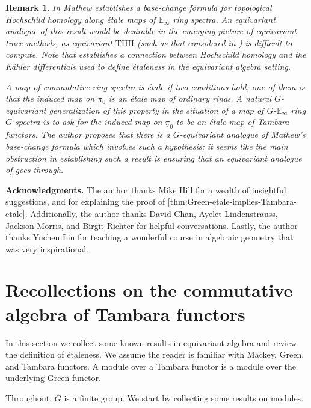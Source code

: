 \documentclass[11pt,dvipsnames]{amsart}
\theoremstyle{BoldRemark}
\newtheorem{remark}[theorem]{Remark}
\begin{document}
\begin{remark}
    In \cite{Mat17} Mathew establishes a base-change formula for topological Hochschild homology along \'{e}tale maps of $\mathbb{E}_\infty$ ring spectra. An equivariant analogue of this result would be desirable in the emerging picture of equivariant trace methods, as equivariant $\mathrm{THH}$ (such as that considered in \cite{CGK25}) is difficult to compute. Note that \cite[Theorem 4.19]{MQS24} establishes a connection between Hochschild homology and the K\"{a}hler differentials used to define \'{e}taleness in the equivariant algebra setting.
    
    A map of commutative ring spectra is \'{e}tale if two conditions hold; one of them is that the induced map on $\pi_0$ is an \'{e}tale map of ordinary rings. A natural $G$-equivariant generalization of this property in the situation of a map of $G$-$\mathbb{E}_\infty$ ring $G$-spectra is to ask for the induced map on $\underline{\pi}_0$ to be an \'{e}tale map of Tambara functors. The author proposes that there is a $G$-equivariant analogue of Mathew's base-change formula which involves such a hypothesis; it seems like the main obstruction in establishing such a result is ensuring that an equivariant analogue of \cite[Proposition 7.5.1.15]{Lur17} goes through.
\end{remark}

\vspace{3mm}

\textbf{Acknowledgments.} The author thanks Mike Hill for a wealth of insightful suggestions, and for explaining the proof of \cref{thm:Green-etale-implies-Tambara-etale}. Additionally, the author thanks David Chan, Ayelet Lindenstrauss, Jackson Morris, and Birgit Richter for helpful conversations. Lastly, the author thanks Yuchen Liu for teaching a wonderful course in algebraic geometry that was very inspirational.

\section{Recollections on the commutative algebra of Tambara functors}

In this section we collect some known results in equivariant algebra and review the definition of \'{e}taleness. We assume the reader is familiar with Mackey, Green, and Tambara functors. A module over a Tambara functor is a module over the underlying Green functor.

Throughout, $G$ is a finite group. We start by collecting some results on modules.
\end{document}
